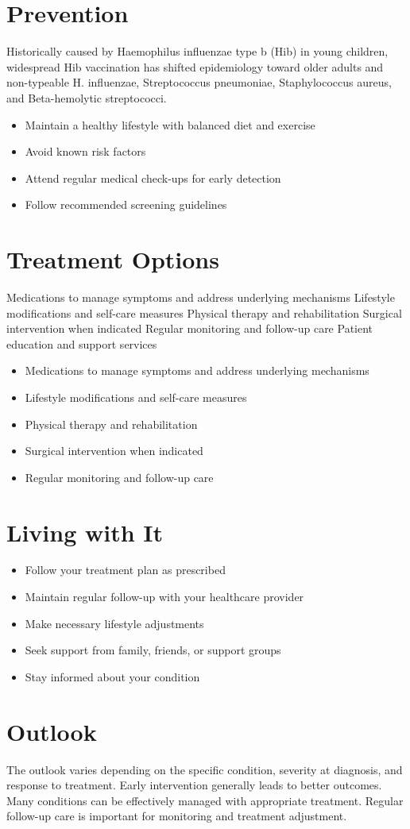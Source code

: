 \section{Prevention}
Historically caused by Haemophilus influenzae type b (Hib) in young children, widespread Hib vaccination has shifted epidemiology toward older adults and non-typeable H. influenzae, Streptococcus pneumoniae, Staphylococcus aureus, and Beta-hemolytic streptococci.

\begin{itemize}[noitemsep]
  \item Maintain a healthy lifestyle with balanced diet and exercise
  \item Avoid known risk factors
  \item Attend regular medical check-ups for early detection
  \item Follow recommended screening guidelines
\end{itemize}
\section{Treatment Options}
Medications to manage symptoms and address underlying mechanisms Lifestyle modifications and self-care measures Physical therapy and rehabilitation Surgical intervention when indicated Regular monitoring and follow-up care Patient education and support services

\begin{itemize}[noitemsep]
  \item Medications to manage symptoms and address underlying mechanisms
  \item Lifestyle modifications and self-care measures
  \item Physical therapy and rehabilitation
  \item Surgical intervention when indicated
  \item Regular monitoring and follow-up care
\end{itemize}
\section{Living with It}
\begin{itemize}[noitemsep]
  \item Follow your treatment plan as prescribed
  \item Maintain regular follow-up with your healthcare provider
  \item Make necessary lifestyle adjustments
  \item Seek support from family, friends, or support groups
  \item Stay informed about your condition
\end{itemize}
\section{Outlook}
The outlook varies depending on the specific condition, severity at diagnosis, and response to treatment. Early intervention generally leads to better outcomes. Many conditions can be effectively managed with appropriate treatment. Regular follow-up care is important for monitoring and treatment adjustment.
